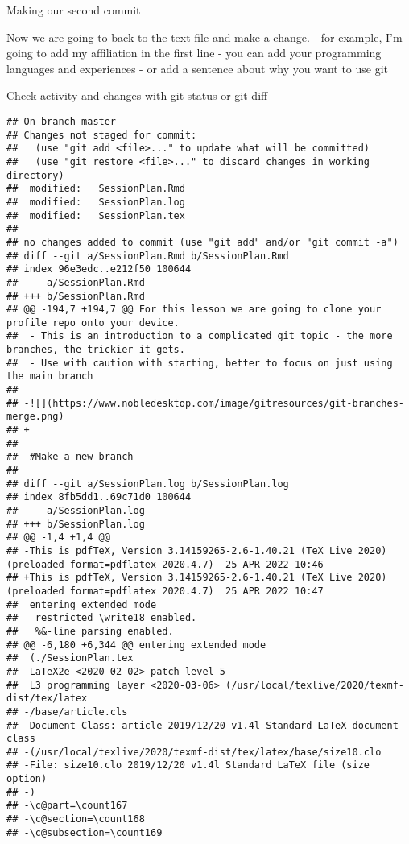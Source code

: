 \documentclass[ignorenonframetext,]{beamer}
\begin{document}
\begin{frame}{Making our second commit}

Now we are going to back to the text file and make a change. - for
example, I'm going to add my affiliation in the first line - you can add
your programming languages and experiences - or add a sentence about why
you want to use git

\end{frame}

\begin{frame}[fragile]{Check activity and changes with git status or git
diff}

\begin{verbatim}
## On branch master
## Changes not staged for commit:
##   (use "git add <file>..." to update what will be committed)
##   (use "git restore <file>..." to discard changes in working directory)
##  modified:   SessionPlan.Rmd
##  modified:   SessionPlan.log
##  modified:   SessionPlan.tex
## 
## no changes added to commit (use "git add" and/or "git commit -a")
## diff --git a/SessionPlan.Rmd b/SessionPlan.Rmd
## index 96e3edc..e212f50 100644
## --- a/SessionPlan.Rmd
## +++ b/SessionPlan.Rmd
## @@ -194,7 +194,7 @@ For this lesson we are going to clone your profile repo onto your device.
##  - This is an introduction to a complicated git topic - the more branches, the trickier it gets. 
##  - Use with caution with starting, better to focus on just using the main branch
##  
## -![](https://www.nobledesktop.com/image/gitresources/git-branches-merge.png)
## +
##  
##  #Make a new branch
##  
## diff --git a/SessionPlan.log b/SessionPlan.log
## index 8fb5dd1..69c71d0 100644
## --- a/SessionPlan.log
## +++ b/SessionPlan.log
## @@ -1,4 +1,4 @@
## -This is pdfTeX, Version 3.14159265-2.6-1.40.21 (TeX Live 2020) (preloaded format=pdflatex 2020.4.7)  25 APR 2022 10:46
## +This is pdfTeX, Version 3.14159265-2.6-1.40.21 (TeX Live 2020) (preloaded format=pdflatex 2020.4.7)  25 APR 2022 10:47
##  entering extended mode
##   restricted \write18 enabled.
##   %&-line parsing enabled.
## @@ -6,180 +6,344 @@ entering extended mode
##  (./SessionPlan.tex
##  LaTeX2e <2020-02-02> patch level 5
##  L3 programming layer <2020-03-06> (/usr/local/texlive/2020/texmf-dist/tex/latex
## -/base/article.cls
## -Document Class: article 2019/12/20 v1.4l Standard LaTeX document class
## -(/usr/local/texlive/2020/texmf-dist/tex/latex/base/size10.clo
## -File: size10.clo 2019/12/20 v1.4l Standard LaTeX file (size option)
## -)
## -\c@part=\count167
## -\c@section=\count168
## -\c@subsection=\count169

\end{verbatim}
\end{frame}
\end{document}
